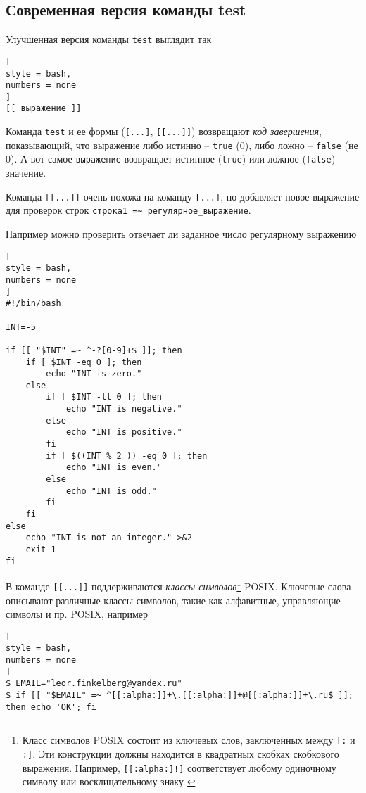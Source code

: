 \documentclass[%
	11pt,
	a4paper,
	utf8,
		]{article}
\begin{document}
\subsection{Современная версия команды test}

Улучшенная версия команды \texttt{test} выглядит так
\begin{lstlisting}[
style = bash,
numbers = none
]
[[ выражение ]]
\end{lstlisting}

Команда \texttt{test} и ее формы (\verb|[...]|, \verb|[[...]]|) возвращают \emph{код завершения}, показывающий, что выражение либо истинно -- \texttt{true} (0), либо ложно -- \texttt{false} (не 0). А вот самое \texttt{выражение} возвращает истинное (\texttt{true}) или ложное (\texttt{false}) значение.

Команда \verb|[[...]]| очень похожа на команду \verb|[...]|, но добавляет новое выражение для проверок строк \verb|строка1 =~ регулярное_выражение|.

Например можно проверить отвечает ли заданное число регулярному выражению
\begin{lstlisting}[
style = bash,
numbers = none
]
#!/bin/bash

INT=-5

if [[ "$INT" =~ ^-?[0-9]+$ ]]; then
    if [ $INT -eq 0 ]; then
        echo "INT is zero."
    else
        if [ $INT -lt 0 ]; then
            echo "INT is negative."
        else
            echo "INT is positive."
        fi
        if [ $((INT % 2 )) -eq 0 ]; then
            echo "INT is even."
        else
            echo "INT is odd."
        fi
    fi
else
    echo "INT is not an integer." >&2
    exit 1
fi
\end{lstlisting}

В команде \verb|[[...]]| поддерживаются \emph{классы символов}\footnote{Класс символов POSIX состоит из ключевых слов, заключенных между \texttt{[:} и \texttt{:]}. Эти конструкции должны находится в квадратных скобках скобкового выражения. Например, \texttt{[[:alpha:]!]} соответствует любому одиночному символу или восклицательному знаку \cite[]{robbins:vim-2013}} POSIX. Ключевые слова описывают различные классы символов, такие как алфавитные, управляющие символы и пр. POSIX, например
\begin{lstlisting}[
style = bash,
numbers = none
]
$ EMAIL="leor.finkelberg@yandex.ru"
$ if [[ "$EMAIL" =~ ^[[:alpha:]]+\.[[:alpha:]]+@[[:alpha:]]+\.ru$ ]]; then echo 'OK'; fi
\end{lstlisting}
\end{document}
